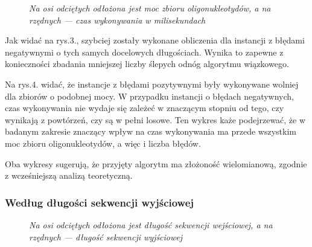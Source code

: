 \documentclass{article}
\begin{document}
\begin{figure}[!htbp]
\caption{\textit{Na osi odciętych odłożona jest moc zbioru oligonukleotydów, a na rzędnych --- czas wykonywania w milisekundach}}
\end{figure}

Jak widać na rys.3., szybciej zostały wykonane obliczenia dla instancji z błędami negatywnymi o tych samych docelowych długościach.
Wynika to zapewne z konieczności zbadania mniejszej liczby ślepych odnóg algorytmu wiązkowego.

Na rys.4. widać, że instancje z błędami pozytywnymi były wykonywane wolniej dla zbiorów o podobnej mocy.
W przypadku instancji o błędach negatywnych, czas wykonywania nie wydaje się zależeć w znaczącym stopniu od tego, czy wynikają z powtórzeń, czy są w pełni losowe.
Ten wykres każe podejrzewać, że w badanym zakresie znaczący wpływ na czas wykonywania ma przede wszystkim moc zbioru oligonukleotydów, a więc i liczba błędów.

Oba wykresy sugerują, że przyjęty algorytm ma złożoność wielomianową, zgodnie z wcześniejszą analizą teoretyczną.

\subsubsection{Według długości sekwencji wyjściowej}


\begin{figure}[!htbp]
\caption{\textit{Na osi odciętych odłożona jest długość sekwencji wejściowej, a na rzędnych --- długość sekwencji wyjściowej}}
\end{figure}
\end{document}
